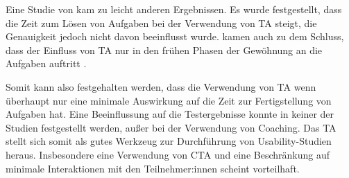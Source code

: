 Eine Studie von \textcite{rheniusEvaluationConcurrent1990} kam zu leicht anderen Ergebnissen. Es wurde festgestellt, dass die Zeit zum Lösen von Aufgaben bei der Verwendung von \ac{TA} steigt, die Genauigkeit jedoch nicht davon beeinflusst wurde. \citeauthor{rheniusEvaluationConcurrent1990} kamen auch zu dem Schluss, dass der Einfluss von \ac{TA} nur in den frühen Phasen der Gewöhnung an die Aufgaben auftritt \parencite{rheniusEvaluationConcurrent1990}.

\pskip
Somit kann also festgehalten werden, dass die Verwendung von \ac{TA} wenn überhaupt nur eine minimale Auswirkung auf die Zeit zur Fertigstellung von Aufgaben hat. Eine Beeinflussung auf die Testergebnisse konnte in keiner der Studien festgestellt werden, außer bei der Verwendung von Coaching. Das \ac{TA} stellt sich somit als gutes Werkzeug zur Durchführung von Usability-Studien heraus. Insbesondere eine Verwendung von \ac{CTA} und eine Beschränkung auf minimale Interaktionen mit den Teilnehmer:innen scheint vorteilhaft.
